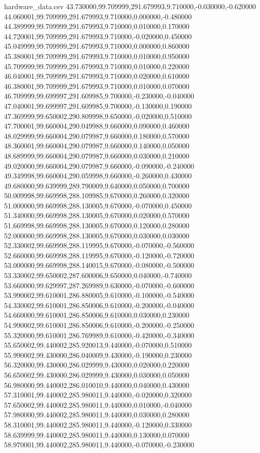 \begin{filecontents}{hardware_data.csv}
43.730000,99.709999,291.679993,9.710000,-0.030000,-0.620000
44.060001,99.709999,291.679993,9.710000,0.000000,-0.480000
44.389999,99.709999,291.679993,9.710000,0.010000,0.170000
44.720001,99.709999,291.679993,9.710000,-0.020000,0.450000
45.049999,99.709999,291.679993,9.710000,0.000000,0.860000
45.380001,99.709999,291.679993,9.710000,0.010000,0.950000
45.709999,99.709999,291.679993,9.710000,0.010000,0.220000
46.040001,99.709999,291.679993,9.710000,0.020000,0.610000
46.380001,99.709999,291.679993,9.710000,0.010000,0.070000
46.709999,99.699997,291.609985,9.700000,-0.230000,-0.040000
47.040001,99.699997,291.609985,9.700000,-0.130000,0.190000
47.369999,99.650002,290.809998,9.650000,-0.020000,0.510000
47.700001,99.660004,290.049988,9.660000,0.090000,0.460000
48.029999,99.660004,290.079987,9.660000,0.180000,0.570000
48.360001,99.660004,290.079987,9.660000,0.140000,0.050000
48.689999,99.660004,290.079987,9.660000,0.030000,0.210000
49.020000,99.660004,290.079987,9.660000,-0.090000,-0.240000
49.349998,99.660004,290.059998,9.660000,-0.260000,0.430000
49.680000,99.639999,289.790009,9.640000,0.050000,0.700000
50.009998,99.669998,288.109985,9.670000,0.260000,0.320000
51.000000,99.669998,288.130005,9.670000,-0.070000,0.450000
51.340000,99.669998,288.130005,9.670000,0.020000,0.570000
51.669998,99.669998,288.130005,9.670000,0.120000,0.280000
52.000000,99.669998,288.130005,9.670000,0.030000,0.030000
52.330002,99.669998,288.119995,9.670000,-0.070000,-0.560000
52.660000,99.669998,288.119995,9.670000,-0.120000,-0.720000
53.000000,99.669998,288.140015,9.670000,-0.080000,-0.500000
53.330002,99.650002,287.600006,9.650000,0.040000,-0.740000
53.660000,99.629997,287.269989,9.630000,-0.070000,-0.600000
53.990002,99.610001,286.880005,9.610000,-0.100000,-0.540000
54.330002,99.610001,286.850006,9.610000,-0.200000,-0.040000
54.660000,99.610001,286.850006,9.610000,0.030000,0.230000
54.990002,99.610001,286.850006,9.610000,-0.200000,-0.250000
55.320000,99.610001,286.769989,9.610000,-0.420000,-0.340000
55.650002,99.440002,285.920013,9.440000,-0.070000,0.510000
55.990002,99.430000,286.040009,9.430000,-0.190000,0.230000
56.320000,99.430000,286.029999,9.430000,0.020000,0.220000
56.650002,99.430000,286.029999,9.430000,0.030000,0.050000
56.980000,99.440002,286.010010,9.440000,0.040000,0.430000
57.310001,99.440002,285.980011,9.440000,-0.020000,0.320000
57.650002,99.440002,285.980011,9.440000,0.010000,-0.040000
57.980000,99.440002,285.980011,9.440000,0.030000,0.280000
58.310001,99.440002,285.980011,9.440000,-0.120000,0.330000
58.639999,99.440002,285.980011,9.440000,0.130000,0.070000
58.970001,99.440002,285.980011,9.440000,-0.070000,-0.230000

\end{filecontents}
